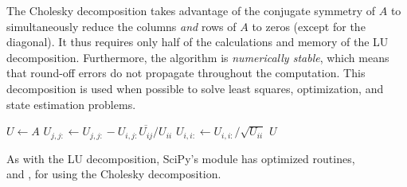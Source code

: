 The Cholesky decomposition takes advantage of the conjugate symmetry of $A$ to simultaneously reduce the columns \emph{and} rows of $A$ to zeros (except for the diagonal).
It thus requires only half of the calculations and memory of the LU decomposition.
Furthermore, the algorithm is \emph{numerically stable}, which means that round-off errors do not propagate throughout the computation.
This decomposition is used when possible to solve least squares, optimization, and state estimation problems.

\begin{algorithm}[H]
\begin{algorithmic}[1]
\State $U \gets A$
        \State $U_{j,j:} \gets U_{j,j:} - U_{i,j:}\overline{U_{ij}}/U_{ii}$
    \EndFor
    \State $U_{i,i:} \gets U_{i,i:}/\sqrt{U_{ii}}$
\EndFor
\State {} $U$
\EndProcedure
\end{algorithmic}
\caption{}
\end{algorithm}

As with the LU decomposition, SciPy's  module has optimized routines,\\ and , for using the Cholesky decomposition.

